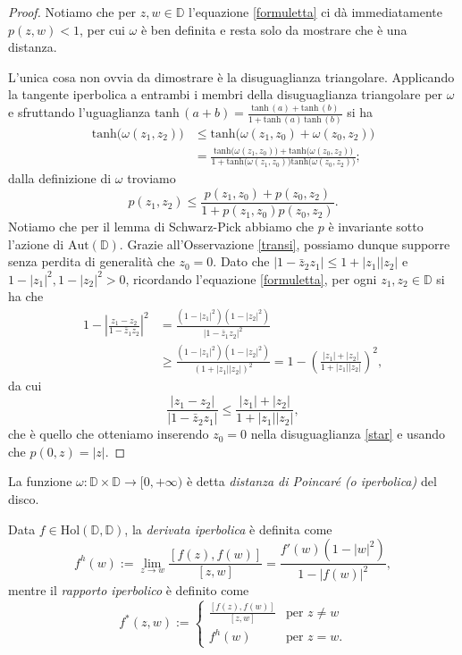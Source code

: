 \begin{proof}
  Notiamo che per $z,w \in \mathbb{D}$ l'equazione \eqref{formuletta} ci dà immediatamente $p(z,w)<1$, per cui $\omega$ è ben definita e resta solo da mostrare che è una distanza.

  L'unica cosa non ovvia da dimostrare è la disuguaglianza triangolare. Applicando la tangente iperbolica a entrambi i membri della disuguaglianza triangolare per $\omega$ e sfruttando l'uguaglianza $\text{tanh}\,(a+b)=\frac{\text{tanh}\,(a)+\text{tanh}\,(b)}{1+\text{tanh}\,(a)\,\text{tanh}\,(b)}$ si ha
  \begin{align*}
    \text{tanh}\bigl(\omega(z_1,z_2)\bigr) & \le \text{tanh}\bigl(\omega(z_1, z_0)+\omega(z_0,z_2)\bigr) \\
    &=\frac{\text{tanh}\bigl(\omega(z_1, z_0)\bigr)+\text{tanh}\bigl(\omega(z_0,z_2)\bigr)}{1+\text{tanh}\bigl(\omega(z_1, z_0)\bigr)\text{tanh}\bigl(\omega(z_0,z_2)\bigr)};
  \end{align*}
  dalla definizione di $\omega$ troviamo
  \begin{equation}
    p(z_1,z_2) \le \frac{p(z_1,z_0)+p(z_0,z_2)}{1+p(z_1,z_0)p(z_0,z_2)}. \label{star}
  \end{equation}
  Notiamo che per il lemma di Schwarz-Pick abbiamo che $p$ è invariante sotto l'azione di $\text{Aut}(\mathbb{D})$. Grazie all'Osservazione \ref{transi}, possiamo dunque supporre senza perdita di generalità che $z_0=0$. Dato che $|1-\bar{z}_2z_1| \le 1+|z_1||z_2|$ e $1-|z_1|^2, 1-|z_2|^2>0$, ricordando l'equazione \eqref{formuletta}, per ogni $z_1, z_2 \in \mathbb{D}$ si ha che
  \begin{align*}
    1-\left|\frac{z_1-z_2}{1-\bar{z}_1z_2}\right|^2 & =\frac{(1-|z_1|^2)(1-|z_2|^2)}{|1-\bar{z}_1z_2|^2} \\
    & \ge \frac{(1-|z_1|^2)(1-|z_2|^2)}{(1+|z_1||z_2|)^2}=1-\left(\frac{|z_1|+|z_2|}{1+|z_1||z_2|}\right)^2,
  \end{align*}
  da cui
  $$\frac{|z_1-z_2|}{|1-\bar{z}_2z_1|} \le \frac{|z_1|+|z_2|}{1+|z_1||z_2|},$$
  che è quello che otteniamo inserendo $z_0=0$ nella disuguaglianza \eqref{star} e usando che $p(0,z)=|z|$.
\end{proof}

\begin{defn}
  La funzione $\omega:\mathbb{D}\times \mathbb{D} \longrightarrow [0,+\infty)$ è detta \textit{distanza di Poincaré (o iperbolica)} del disco.
\end{defn}

\begin{defn}
  Data $f \in \text{Hol}(\mathbb{D},\mathbb{D})$, la \textit{derivata iperbolica} è definita come
  $$f^h(w):=\lim_{z \longrightarrow w} \frac{[f(z),f(w)]}{[z,w]}=\frac{f'(w)(1-|w|^2)}{1-|f(w)|^2},$$
  mentre il \textit{rapporto iperbolico} è definito come
  $$f^*(z,w):=\begin{cases}
    \frac{[f(z),f(w)]}{[z,w]} & \mbox{per }z\not=w \\
    f^h(w) & \mbox{per }z=w.
  \end{cases}$$
\end{defn}

